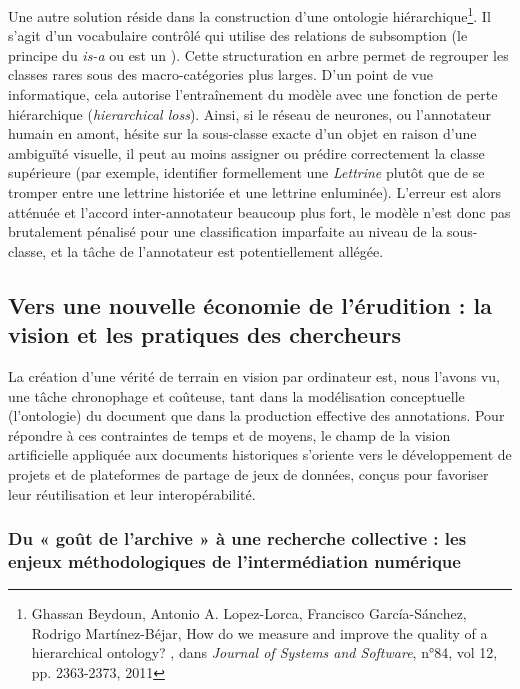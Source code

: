 Une autre solution réside dans la construction d'une ontologie hiérarchique\footnote{Ghassan Beydoun, Antonio A. Lopez-Lorca, Francisco García-Sánchez, Rodrigo Martínez-Béjar, \og How do we measure and improve the quality of a hierarchical ontology? \fg, dans \textit{Journal of Systems and Software}, n°84, vol 12, pp. 2363-2373, 2011}. Il s'agit d'un vocabulaire contrôlé qui utilise des relations de subsomption (le principe du \textit{is-a} ou \og est un \fg). Cette structuration en arbre permet de regrouper les classes rares sous des macro-catégories plus larges. D'un point de vue informatique, cela autorise l'entraînement du modèle avec une fonction de perte hiérarchique (\textit{hierarchical loss}). Ainsi, si le réseau de neurones, ou l'annotateur humain en amont, hésite sur la sous-classe exacte d'un objet en raison d'une ambiguïté visuelle, il peut au moins assigner ou prédire correctement la classe supérieure (par exemple, identifier formellement une \textit{Lettrine} plutôt que de se tromper entre une lettrine historiée et une lettrine enluminée). L'erreur est alors atténuée et l'accord inter-annotateur beaucoup plus fort, le modèle n'est donc pas brutalement pénalisé pour une classification imparfaite au niveau de la sous-classe, et la tâche de l'annotateur est potentiellement allégée.


\subsection{Vers une \og nouvelle économie de l'érudition \fg{} : la vision et les pratiques des chercheurs}

La création d'une vérité de terrain en vision par ordinateur est, nous l'avons vu, une tâche chronophage et coûteuse, tant dans la modélisation conceptuelle (l'ontologie) du document que dans la production effective des annotations. Pour répondre à ces contraintes de temps et de moyens, le champ de la vision artificielle appliquée aux documents historiques s'oriente vers le développement de projets et de plateformes de partage de jeux de données, conçus pour favoriser leur réutilisation et leur interopérabilité.

\subsubsection{Du « goût de l'archive » à une recherche collective : les enjeux méthodologiques de l'intermédiation numérique}

